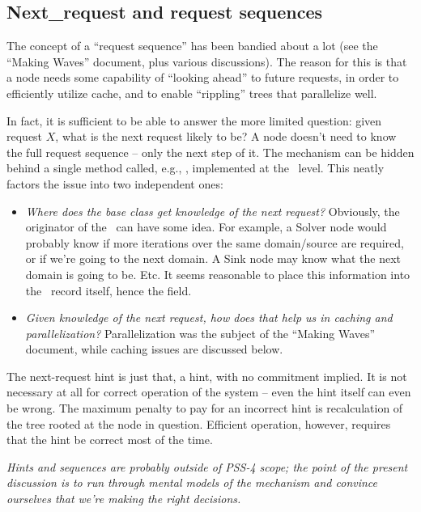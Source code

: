 \documentclass[10pt]{article}
\begin{document}
\subsection{Next\_request and request sequences}

  The concept of a ``request sequence'' has been bandied about a lot (see the
  ``Making Waves'' document, plus various discussions). The reason for this is
  that a node needs some capability of ``looking ahead'' to future requests, in
  order to efficiently utilize cache, and to enable ``rippling'' trees that
  parallelize well.

  In fact, it is sufficient to be able to answer the more limited question:
  given request $X$, what is the next request likely to be? A node doesn't 
  need to know the full request sequence -- only the next step of it. The
  mechanism can be hidden behind a single method called, e.g.,
  , implemented at the \Node\ level. This neatly
  factors the issue into two independent ones:

  \begin{itemize}
  
  \item {\em Where does the base  class get knowledge of the
    next request?} Obviously, the originator of the \Request\ can have some
    idea.  For example, a Solver node would probably know if more iterations
    over the same domain/source are required, or if we're going to the next
    domain. A Sink node may know what the next domain is going to be. Etc. It
    seems reasonable to place this information into the \Request\ record
    itself, hence the  field.

  \item {\em Given knowledge of the next request, how does that help us in
    caching and parallelization?} Parallelization was the subject of the
    ``Making Waves'' document, while caching issues are discussed below.

  \end{itemize}
  
  The next-request hint is just that, a hint, with no commitment implied. It is
  not necessary at all for correct operation of the system -- even the hint
  itself can even be wrong. The maximum penalty to pay for an incorrect hint is
  recalculation of the tree rooted at the node in question. Efficient
  operation, however, requires that the hint be correct most of the time.

  {\em Hints and sequences are probably outside of PSS-4 scope; the point of
  the present discussion is to run through mental models of the mechanism and
  convince ourselves that we're making the right decisions.}
\end{document}
